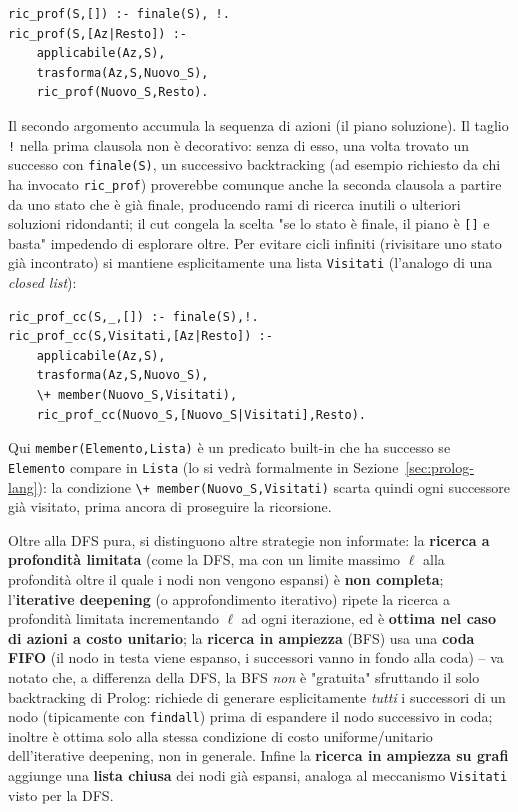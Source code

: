 \documentclass[a4paper,11pt]{article}
\begin{document}
\begin{lstlisting}
ric_prof(S,[]) :- finale(S), !.
ric_prof(S,[Az|Resto]) :-
    applicabile(Az,S),
    trasforma(Az,S,Nuovo_S),
    ric_prof(Nuovo_S,Resto).
\end{lstlisting}

Il secondo argomento accumula la sequenza di azioni (il piano soluzione). Il taglio \texttt{!} nella prima clausola non è decorativo: senza di esso, una volta trovato un successo con \texttt{finale(S)}, un successivo backtracking (ad esempio richiesto da chi ha invocato \texttt{ric\_prof}) proverebbe comunque anche la seconda clausola a partire da uno stato che è già finale, producendo rami di ricerca inutili o ulteriori soluzioni ridondanti; il cut congela la scelta "se lo stato è finale, il piano è \texttt{[]} e basta" impedendo di esplorare oltre. Per evitare cicli infiniti (rivisitare uno stato già incontrato) si mantiene esplicitamente una lista \texttt{Visitati} (l'analogo di una \emph{closed list}):

\begin{lstlisting}
ric_prof_cc(S,_,[]) :- finale(S),!.
ric_prof_cc(S,Visitati,[Az|Resto]) :-
    applicabile(Az,S),
    trasforma(Az,S,Nuovo_S),
    \+ member(Nuovo_S,Visitati),
    ric_prof_cc(Nuovo_S,[Nuovo_S|Visitati],Resto).
\end{lstlisting}

Qui \texttt{member(Elemento,Lista)} è un predicato built-in che ha successo se \texttt{Elemento} compare in \texttt{Lista} (lo si vedrà formalmente in Sezione~\ref{sec:prolog-lang}): la condizione \texttt{\textbackslash+ member(Nuovo\_S,Visitati)} scarta quindi ogni successore già visitato, prima ancora di proseguire la ricorsione.

Oltre alla DFS pura, si distinguono altre strategie non informate: la \textbf{ricerca a profondità limitata} (come la DFS, ma con un limite massimo $\ell$ alla profondità oltre il quale i nodi non vengono espansi) è \textbf{non completa}; l'\textbf{iterative deepening} (o approfondimento iterativo) ripete la ricerca a profondità limitata incrementando $\ell$ ad ogni iterazione, ed è \textbf{ottima nel caso di azioni a costo unitario}; la \textbf{ricerca in ampiezza} (BFS) usa una \textbf{coda FIFO} (il nodo in testa viene espanso, i successori vanno in fondo alla coda) -- va notato che, a differenza della DFS, la BFS \emph{non} è "gratuita" sfruttando il solo backtracking di Prolog: richiede di generare esplicitamente \emph{tutti} i successori di un nodo (tipicamente con \texttt{findall}) prima di espandere il nodo successivo in coda; inoltre è ottima solo alla stessa condizione di costo uniforme/unitario dell'iterative deepening, non in generale. Infine la \textbf{ricerca in ampiezza su grafi} aggiunge una \textbf{lista chiusa} dei nodi già espansi, analoga al meccanismo \texttt{Visitati} visto per la DFS.
\end{document}
